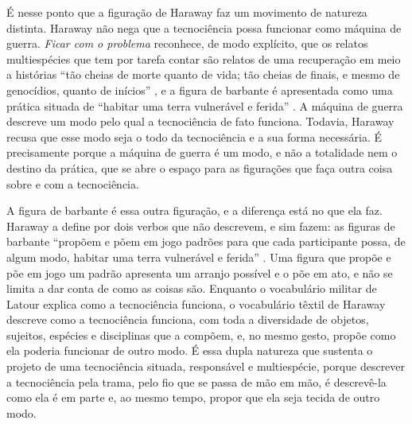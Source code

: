 É nesse ponto que a figuração de Haraway faz um movimento de natureza distinta. Haraway não nega que a tecnociência possa funcionar como máquina de guerra. \emph{Ficar com o problema} reconhece, de modo explícito, que os relatos multiespécies que tem por tarefa contar são relatos de uma recuperação em meio a histórias \enquote{tão cheias de morte quanto de vida; tão cheias de finais, e mesmo de genocídios, quanto de inícios} \parencite[p.~25]{Haraway2023Ficar}, e a figura de barbante é apresentada como uma prática situada de \enquote{habitar uma terra vulnerável e ferida} \parencite[p.~25]{Haraway2023Ficar}. A máquina de guerra descreve um modo pelo qual a tecnociência de fato funciona. Todavia, Haraway recusa que esse modo seja o todo da tecnociência e a sua forma necessária. É precisamente porque a máquina de guerra é um modo, e não a totalidade nem o destino da prática, que se abre o espaço para as figurações que faça outra coisa sobre e com a tecnociência. 

A figura de barbante é essa outra figuração, e a diferença está no que ela faz. Haraway a define por dois verbos que não descrevem, e sim fazem: as figuras de barbante \enquote{propõem e põem em jogo padrões para que cada participante possa, de algum modo, habitar uma terra vulnerável e ferida} \parencite[p.~25]{Haraway2023Ficar}. Uma figura que propõe e põe em jogo um padrão apresenta um arranjo possível e o põe em ato, e não se limita a dar conta de como as coisas são. Enquanto o vocabulário militar de Latour explica como a tecnociência funciona, o vocabulário têxtil de Haraway descreve como a tecnociência funciona, com toda a diversidade de objetos, sujeitos, espécies e disciplinas que a compõem, e, no mesmo gesto, propõe como ela poderia funcionar de outro modo. É essa dupla natureza que sustenta o projeto de uma tecnociência situada, responsável e multiespécie, porque descrever a tecnociência pela trama, pelo fio que se passa de mão em mão, é descrevê-la como ela é em parte e, ao mesmo tempo, propor que ela seja tecida de outro modo.

